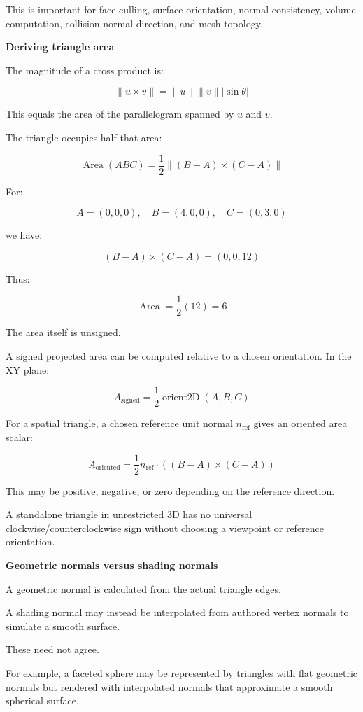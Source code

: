 This is important for face culling, surface orientation, normal consistency, volume computation, collision normal direction, and mesh topology.

\textbf{Deriving triangle area}

The magnitude of a cross product is:

\[
\|u\times v\|=\|u\|\|v\||\sin\theta|
\]

This equals the area of the parallelogram spanned by \(u\) and \(v\).

The triangle occupies half that area:

\[
\boxed{ \operatorname{Area}(ABC)= \frac12\|(B-A)\times(C-A)\| }
\]

For:

\[
A=(0,0,0),\quad B=(4,0,0),\quad C=(0,3,0)
\]

we have:

\[
(B-A)\times(C-A)=(0,0,12)
\]

Thus:

\[
\operatorname{Area}=\frac12(12)=6
\]

The area itself is unsigned.

A signed projected area can be computed relative to a chosen orientation. In the XY plane:

\[
A_{\mathrm{signed}}= \frac12\operatorname{orient2D}(A,B,C)
\]

For a spatial triangle, a chosen reference unit normal \(n_{\mathrm{ref}}\) gives an oriented area scalar:

\[
A_{\mathrm{oriented}}= \frac12n_{\mathrm{ref}}\cdot ((B-A)\times(C-A))
\]

This may be positive, negative, or zero depending on the reference direction.

A standalone triangle in unrestricted 3D has no universal clockwise/counterclockwise sign without choosing a viewpoint or reference orientation.

\textbf{Geometric normals versus shading normals}

A geometric normal is calculated from the actual triangle edges.

A shading normal may instead be interpolated from authored vertex normals to simulate a smooth surface.

These need not agree.

For example, a faceted sphere may be represented by triangles with flat geometric normals but rendered with interpolated normals that approximate a smooth spherical surface.

